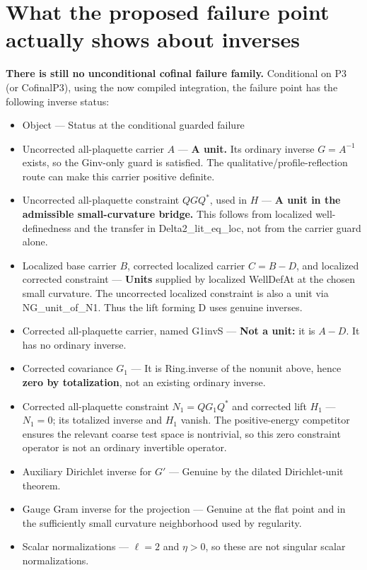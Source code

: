 \section{What the proposed failure point actually shows about inverses}

\textbf{There is still no unconditional cofinal failure family.} Conditional on P3 (or CofinalP3), using the now compiled integration, the failure point has the following inverse status:

\begin{itemize}
\item  Object  ---  Status at the conditional guarded failure 
\item  Uncorrected all-plaquette carrier \(A\)  ---  \textbf{A unit.} Its ordinary inverse \(G=A^{-1}\) exists, so the Ginv-only guard is satisfied. The qualitative/profile-reflection route can make this carrier positive definite. 
\item  Uncorrected all-plaquette constraint \(QGQ^*\), used in \(H\)  ---  \textbf{A unit in the admissible small-curvature bridge.} This follows from localized well-definedness and the transfer in Delta2\_lit\_eq\_loc, not from the carrier guard alone. 
\item  Localized base carrier \(B\), corrected localized carrier \(C=B-D\), and localized corrected constraint  ---  \textbf{Units} supplied by localized WellDefAt at the chosen small curvature. The uncorrected localized constraint is also a unit via NG\_unit\_of\_N1. Thus the lift forming D uses genuine inverses. 
\item  Corrected all-plaquette carrier, named G1invS  ---  \textbf{Not a unit:} it is \(A-D\). It has no ordinary inverse. 
\item  Corrected covariance \(G_1\)  ---  It is Ring.inverse of the nonunit above, hence \textbf{zero by totalization}, not an existing ordinary inverse. 
\item  Corrected all-plaquette constraint \(N_1=QG_1Q^*\) and corrected lift \(H_1\)  ---  \(N_1=0\); its totalized inverse and \(H_1\) vanish. The positive-energy competitor ensures the relevant coarse test space is nontrivial, so this zero constraint operator is not an ordinary invertible operator. 
\item  Auxiliary Dirichlet inverse for \(G'\)  ---  Genuine by the dilated Dirichlet-unit theorem. 
\item  Gauge Gram inverse for the projection  ---  Genuine at the flat point and in the sufficiently small curvature neighborhood used by regularity. 
\item  Scalar normalizations  ---  \(\ell=2\) and \(\eta>0\), so these are not singular scalar normalizations. 
\end{itemize}

